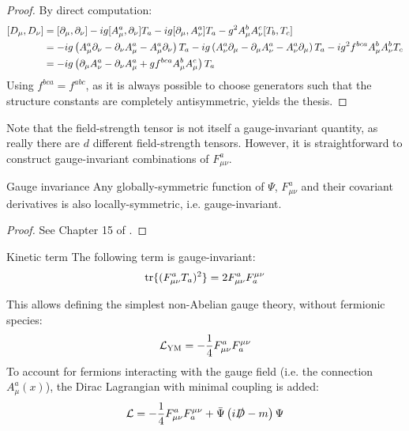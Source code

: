 \begin{proofbox}
  \begin{proof}
    By direct computation:
    \begin{equation*}
      \begin{split}
        [D_\mu , D_\nu]
        & = [\partial_\mu , \partial_\nu] - i g [A_\mu^a , \partial_\nu] T_a - i g [\partial_\mu , A_\nu^a] T_a - g^2 A_\mu^b A_\nu^c [T_b , T_c] \\
        & = - i g \left( A_\mu^a \partial_\nu - \partial_\nu A_\mu^a - A_\mu^a \partial_\nu \right) T_a - i g \left( A_\nu^a \partial_\mu - \partial_\mu A_\nu^a - A_\nu^a \partial_\mu \right) T_a - i g^2 f^{bca} A_\mu^b A_\nu^b T_c \\
        & = - i g \left( \partial_\mu A_\nu^a - \partial_\nu A_\mu^a + g f^{bca} A_\mu^b A_\mu^c \right) T_a
      \end{split}
    \end{equation*}
    Using $ f^{bca} = f^{abc} $, as it is always possible to choose generators such that the structure constants are completely antisymmetric, yields the thesis.
  \end{proof}
\end{proofbox}

Note that the field-strength tensor is not itself a gauge-invariant quantity, as really there are $ d $ different field-strength tensors. However, it is straightforward to construct gauge-invariant combinations of $ F_{\mu \nu}^a $.

\begin{theorem}{Gauge invariance}{}
  Any globally-symmetric function of $ \Psi $, $ F_{\mu \nu}^a $ and their covariant derivatives is also locally-symmetric, i.e. gauge-invariant.
\end{theorem}

\begin{proofbox}
  \begin{proof}
    See Chapter 15 of \cite{Peskin-1995}.
  \end{proof}
\end{proofbox}

\begin{lemma}{Kinetic term}{}
  The following term is gauge-invariant:
  \begin{equation}
    \operatorname{tr} \{(F_{\mu \nu}^a T_a)^2\} = 2 F_{\mu \nu}^a F^{\mu \nu}_a
  \end{equation}
\end{lemma}

This allows defining the simplest non-Abelian gauge theory,  without fermionic species:
\begin{equation}
  \mathcal{L}_\text{YM} = - \frac{1}{4} F_{\mu \nu}^a F^{\mu \nu}_a
\end{equation}
To account for fermions interacting with the gauge field (i.e. the connection $ A_\mu^a(x) $), the Dirac Lagrangian with minimal coupling is added:
\begin{equation}
  \mathcal{L} = - \frac{1}{4} F_{\mu \nu}^a F^{\mu \nu}_a + \bar{\Psi} \left( i \slashed{D} - m \right) \Psi
  \label{eq:qcd-lag}
\end{equation}

